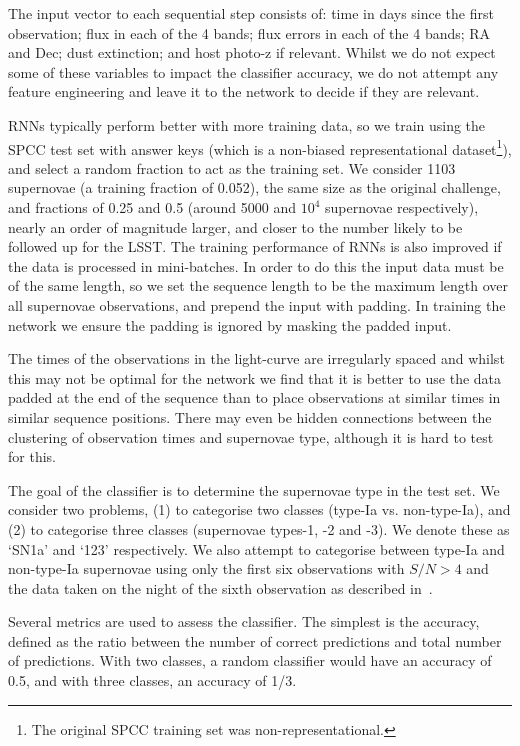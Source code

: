 \documentclass[twocolumn]{aastex61}
\begin{document}
The input vector to each sequential step consists of: time in days since the first observation; flux in each of the 4 bands; flux errors in each of the 4 bands; RA and Dec; dust extinction; and host photo-z if relevant. Whilst we do not expect some of these variables to impact the classifier accuracy, we do not attempt any feature engineering and leave it to the network to decide if they are relevant. 

RNNs typically perform better with more training data, so we train using the SPCC test set with answer keys (which is a non-biased representational dataset\footnote{The original SPCC training set was non-representational.}), and select a random fraction to act as the training set. We consider 1103 supernovae (a training fraction of 0.052), the same size as the original challenge, and fractions of 0.25 and 0.5 (around 5000 and $10^4$ supernovae respectively), nearly an order of magnitude larger, and closer to the number likely to be followed up for the LSST. The training performance of RNNs is also improved if the data is processed in mini-batches. In order to do this the input data must be of the same length, so we set the sequence length to be the maximum length over all supernovae observations, and prepend the input with padding. In training the network we ensure the padding is ignored by masking the padded input. 
 
The times of the observations in the light-curve are irregularly spaced and whilst this may not be optimal for the network we find that it is better to use the data padded at the end of the sequence than to place observations at similar times in similar sequence positions. There may even be hidden connections between the clustering of observation times and supernovae type, although it is hard to test for this.

The goal of the classifier is to determine the supernovae type in the test set. We consider two problems, (1) to categorise two classes (type-Ia vs. non-type-Ia), and (2) to categorise three classes (supernovae types-1, -2 and -3). We denote these as  `SN1a' and  `123' respectively. We also attempt to categorise between type-Ia and non-type-Ia supernovae using only the first six observations with $S/N>4$ and the data taken on the night of the sixth observation as described in~\cite{Kessler:2010wk}.

Several metrics are used to assess the classifier. The simplest is the accuracy, defined as the ratio between the number of correct predictions and total number of predictions. With two classes, a random classifier would have an accuracy of 0.5, and with three classes, an accuracy of 1/3.
\end{document}
